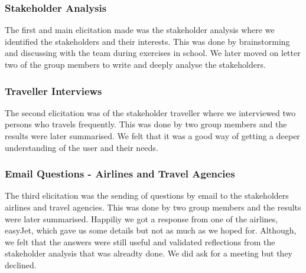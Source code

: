 \subsubsection{Stakeholder Analysis}
The first and main elicitation made was the stakeholder analysis where we identified the stakeholders and their interests. This was done by brainstorming and discussing with the team during exercises in school. We later moved on letter two of the group members to write and deeply analyse the stakeholders.

\subsubsection{Traveller Interviews}
The second elicitation was of the stakeholder traveller where we interviewed two persons who travels frequently. This was done by two group members and the results were later summarised. We felt that it was a good way of getting a deeper understanding of the user and their needs. 

\subsubsection{Email Questions - Airlines and Travel Agencies}
The third elicitation was the sending of questions by email to the stakeholders airlines and travel agencies. This was done by two group members and the results were later summarised. Happiliy we got a response from one of the airlines, easyJet, which gave us some details but not as much as we hoped for. Although, we felt that the answers were still useful and validated reflections from the stakeholder analysis that was alreadty done. We did ask for a meeting but they declined.
